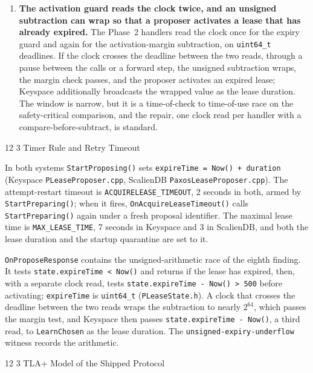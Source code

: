 \documentclass[final,5p,times,twocolumn,number]{elsarticle}
\makeatletter
\newcommand{\code}[1]{\texttt{#1}}
\renewcommand\subsection{\@startsection{subsection}{2}{\z@}%
           {12\p@ \@plus 6\p@ \@minus 3\p@}%
           {3\p@ \@plus 6\p@ \@minus 3\p@}%
           {\normalfont\normalsize\bfseries}}
\makeatother
\begin{document}
\begin{enumerate}
\item \textbf{The activation guard reads the clock twice, and an unsigned subtraction can wrap so that a proposer activates a lease that has already expired.}  The Phase~2 handlers read the clock once for the expiry guard and again for the activation-margin subtraction, on \code{uint64\_t} deadlines.  If the clock crosses the deadline between the two reads, through a pause between the calls or a forward step, the unsigned subtraction wraps, the margin check passes, and the proposer activates an expired lease; Keyspace additionally broadcasts the wrapped value as the lease duration.  The window is narrow, but it is a time-of-check to time-of-use race on the safety-critical comparison, and the repair, one clock read per handler with a compare-before-subtract, is standard.
\end{enumerate}

\subsection{Timer Rule and Retry Timeout}

In both systems \code{StartProposing()} sets \code{expireTime = Now() + duration} (Keyspace \code{PLeaseProposer.cpp}, ScalienDB \code{PaxosLeaseProposer.cpp}).  The attempt-restart timeout is \code{ACQUIRELEASE\_TIMEOUT}, 2 seconds in both, armed by \code{StartPreparing()}; when it fires, \code{OnAcquireLeaseTimeout()} calls \code{StartPreparing()} again under a fresh proposal identifier.  The maximal lease time is \code{MAX\_LEASE\_TIME}, 7 seconds in Keyspace and 3 in ScalienDB, and both the lease duration and the startup quarantine are set to it.

\code{OnProposeResponse} contains the unsigned-arithmetic race of the eighth finding.  It tests \code{state.expireTime < Now()} and returns if the lease has expired, then, with a separate clock read, tests \code{state.expireTime - Now() > 500} before activating; \code{expireTime} is \code{uint64\_t} (\code{PLeaseState.h}).  A clock that crosses the deadline between the two reads wraps the subtraction to nearly $2^{64}$, which passes the margin test, and Keyspace then passes \code{state.expireTime - Now()}, a third read, to \code{LearnChosen} as the lease duration.  The \code{unsigned-expiry-underflow} witness records the arithmetic.

\subsection{TLA+ Model of the Shipped Protocol}
\end{document}
